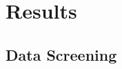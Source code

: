 \documentclass{article}
\begin{document}










\section{Results}

\subsection{Data Screening}

\end{document}
